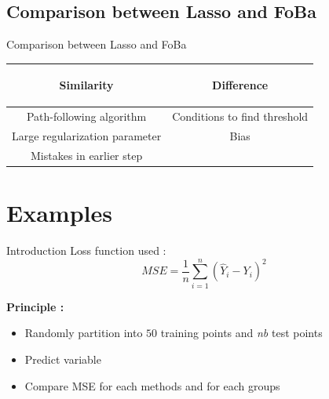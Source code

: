\documentclass[unknownkeysallowed]{beamer}
\begin{document}

\subsection*{Comparison between Lasso and FoBa}

\begin{frame}{Comparison between Lasso and FoBa}

\begin{table}
        \centering
        \begin{tabular}{| c | c |}
        \hline
        \begin{bf} Similarity \end{bf} &
        \begin{bf} Difference \end{bf} \\
        \hline
        Path-following algorithm &  Conditions to find threshold \\
        Large regularization parameter & Bias \\
        Mistakes in earlier step &  \\
        \hline
        \end{tabular}
    \end{table}
\end{frame}



\section{Examples}
\label{sec:example}

\begin{frame}{Introduction}
Loss function used : \[MSE = \frac{1}{n} \sum_{i=1}^n (\hat{Y}_i-Y_i)^2\]

\textbf{Principle : } 
\begin{itemize}
    \item Randomly partition into $50$ training points and \textit{nb} test points
    \item Predict variable
    \item Compare MSE for each methods and for each groups
\end{itemize}
\end{frame}
\end{document}
